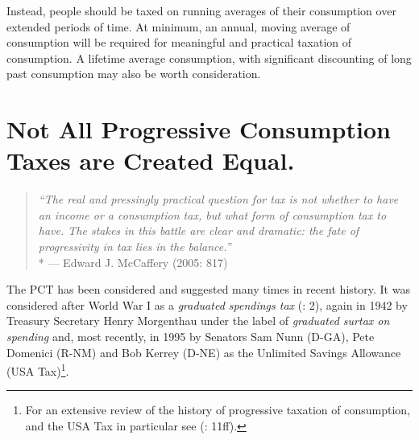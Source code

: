 Instead, people should be taxed on running averages of their consumption over extended periods of time. At minimum, an annual, moving average of consumption will be required for meaningful and practical taxation of consumption. A lifetime average consumption, with significant discounting of long past consumption may also be worth consideration.


\section[The PCT's Evil Twins]{Not All Progressive Consumption Taxes are Created Equal.}

\begin{quote}
	\emph{``The real and pressingly practical question for tax is not whether to have an income or a consumption tax, but what form of consumption tax to have. The stakes in this battle are clear and dramatic: the fate of progressivity in tax lies in the balance.''}\\*
	--- Edward J. McCaffery (2005: 817)
\end{quote}

 \label{sec:PCTTwins} The PCT has been considered and suggested many times in recent history. It was considered after World War I as a \emph{graduated spendings tax} (\citealt{Bank2004}: 2), again in 1942 by Treasury Secretary Henry Morgenthau under the label of \emph{graduated surtax on spending} and, most recently, in 1995 by Senators Sam Nunn (D-GA), Pete Domenici (R-NM) and Bob Kerrey (D-NE) as the Unlimited Savings Allowance (USA Tax)\footnote{
	For an extensive review of the history of progressive taxation of consumption, and the USA Tax in particular see \citeauthor{Seidman1997} (\citeyear{Seidman1997}: 11ff).}.




